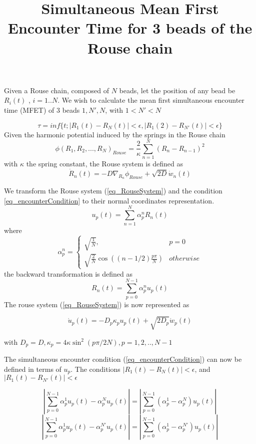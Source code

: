 \documentclass{report}
\title{Simultaneous Mean First Encounter Time for 3 beads of the Rouse chain}
\begin{document}
	\maketitle
 Given a Rouse chain, composed of $N$ beads, let the position of any bead be $R_i(t)$ , $i=1..N$. 	We wish to calculate the mean first simultaneous encounter time (MFET) of 3 beads $1,N',N$, with $1<N'<N$
  
	\begin{equation}\label{eq_encounterCondition}
	\tau=inf \{t ; |R_1(t)-R_N(t)|< \epsilon , |R_1(2)-R_{N'}(t)|<\epsilon \}
	\end{equation}
	Given the harmonic potential induced by the springs in the Rouse chain 
	\begin{equation}
	\phi(R_1,R_2,...,R_N)_{Rouse}=\frac{2}{\kappa}\sum_{n=1}^N (R_n-R_{n-1})^2
	\end{equation}
	with $\kappa$ the spring constant, the Rouse system is defined as 
	\begin{equation}\label{eq_RouseSystem}
	\dot{R}_n(t) = -D\nabla_{R_n}\phi_{Rouse} +\sqrt{2D}\dot{w}_n(t)
	\end{equation}

 We transform the Rouse system (\ref{eq_RouseSystem}) and the condition \ref{eq_encounterCondition} to their normal coordinates representation.
 \begin{equation}\label{eq_normalTransform}
 u_p(t)=\sum_{n=1}^N \alpha ^n_p R_n(t)
 \end{equation} 
 where 
 \begin{equation}
 \alpha_p^n = \begin{cases}
\sqrt{\frac{1}{N}}, & p=0 \\
\sqrt{\frac{2}{N}}\cos((n-1/2)\frac{p\pi}{N})  & otherwise
 \end{cases}
 \end{equation}
 the backward transformation is defined as 
 \begin{equation}\label{eq_backTransform}
 R_n(t) =\sum_{p=0}^{N-1}\alpha_p^n u_p(t)
 \end{equation}
 	The rouse system (\ref{eq_RouseSystem}) is now represented as 
 	
 \begin{equation}\label{eq_RouseSystemNormalCoordinates}
 \dot{u}_p(t)=-D_p\kappa_pu_p(t)+\sqrt{2D_p}\dot{w}_p(t)
 \end{equation}
 
 with $D_p=D, \kappa_p = 4\kappa \sin^2(p\pi /2N), p=1,2,..,N-1$
 
The simultaneous encounter condition (\ref{eq_encounterCondition}) can now be defined in terms of $u_p$. The conditions $|R_1(t)-R_N(t)|<\epsilon$, and  $|R_1(t)-R_{N'}(t)|<\epsilon$

\begin{equation}\label{eq_encounterConditionNormalCoordinates1}
|\sum_{p=0}^{N-1}\alpha_p^1 u_p(t)-\alpha_p^Nu_p(t)|=|\sum_{p=0}^{N-1}(\alpha_p^1-\alpha_p^N)u_p(t)|
\end{equation}
\begin{equation}\label{eq_encounterConditionNormalCoordinates2}
|\sum_{p=0}^{N-1}\alpha_p^1 u_p(t)-\alpha_p^{N'}u_p(t)| =|\sum_{p=0}^{N-1}(\alpha_p^1-\alpha_p^{N'})u_p(t)|
\end{equation}
\end{document}
